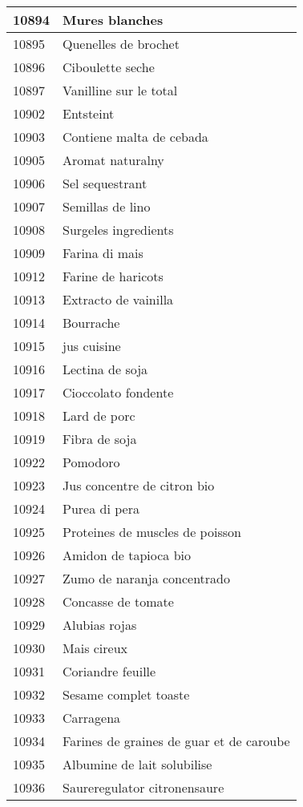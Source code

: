 \begin{longtable}{|l|l|}
10894 & Mures blanches \\ \hline 
10895 & Quenelles de brochet \\ \hline 
10896 & Ciboulette seche \\ \hline 
10897 & Vanilline sur le total \\ \hline 
10902 & Entsteint \\ \hline 
10903 & Contiene malta de cebada \\ \hline 
10905 & Aromat naturalny \\ \hline 
10906 & Sel sequestrant \\ \hline 
10907 & Semillas de lino \\ \hline 
10908 & Surgeles ingredients \\ \hline 
10909 & Farina di mais \\ \hline 
10912 & Farine de haricots \\ \hline 
10913 & Extracto de vainilla \\ \hline 
10914 & Bourrache \\ \hline 
10915 & jus cuisine \\ \hline 
10916 & Lectina de soja \\ \hline 
10917 & Cioccolato fondente \\ \hline 
10918 & Lard de porc \\ \hline 
10919 & Fibra de soja \\ \hline 
10922 & Pomodoro \\ \hline 
10923 & Jus concentre de citron bio \\ \hline 
10924 & Purea di pera \\ \hline 
10925 & Proteines de muscles de poisson \\ \hline 
10926 & Amidon de tapioca bio \\ \hline 
10927 & Zumo de naranja concentrado \\ \hline 
10928 & Concasse de tomate \\ \hline 
10929 & Alubias rojas \\ \hline 
10930 & Mais cireux \\ \hline 
10931 & Coriandre feuille \\ \hline 
10932 & Sesame complet toaste \\ \hline 
10933 & Carragena \\ \hline 
10934 & Farines de graines de guar et de caroube \\ \hline 
10935 & Albumine de lait solubilise \\ \hline 
10936 & Saureregulator citronensaure \\ \hline 

\end{longtable}
